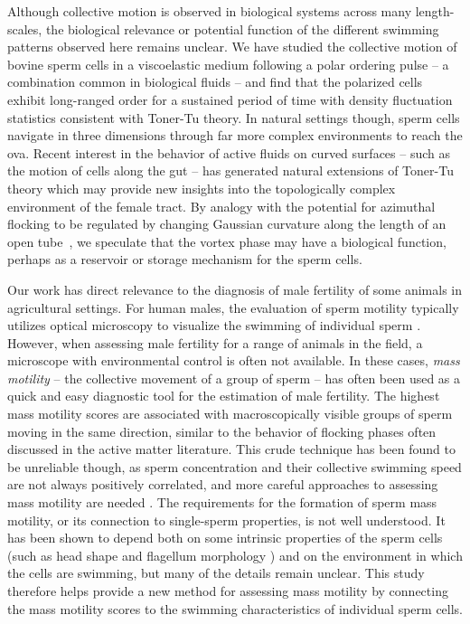 \documentclass[reprint,unsortedaddress,amsmath,amssymb,aps,pre]{revtex4-2}
\begin{document}
Although collective motion is observed in biological systems across many length-scales, the biological relevance or potential function of the different swimming patterns observed here remains unclear. We have studied the collective motion of bovine sperm cells in a viscoelastic medium following a polar ordering pulse -- a combination common in biological fluids -- and find that the polarized cells exhibit long-ranged order for a sustained period of time with density fluctuation statistics consistent with Toner-Tu theory. In natural settings though, sperm cells navigate in three dimensions through far more complex environments to reach the ova. Recent interest in the behavior of active fluids on curved surfaces \cite{sknepnek2015active} -- such as the motion of cells along the gut \cite{ritsma2014intestinal} -- has generated natural extensions of Toner-Tu theory \cite{shankar2017topological} which may provide new insights into the topologically complex environment of the female tract. By analogy with the potential for azimuthal flocking to be regulated by changing Gaussian curvature along the length of an open tube~\cite{shankar2017topological}, we speculate that the vortex phase may have a biological function, perhaps as a reservoir or storage mechanism for the sperm cells.

Our work has direct relevance to the diagnosis of male fertility of some animals in agricultural settings. For human males, the evaluation of sperm motility typically utilizes optical microscopy to visualize the swimming of individual sperm \cite{Gaffney2021modelling}. However, when assessing male fertility for a range of animals in the field, a microscope with environmental control is often not available. In these cases, \emph{mass motility} -- the collective movement of a group of sperm \cite{DAVID2015mass, david2018new} -- has often been used as a quick and easy diagnostic tool for the estimation of male fertility. The highest mass motility scores are associated with macroscopically visible groups of sperm moving in the same direction, similar to the behavior of flocking phases often discussed in the active matter literature. This crude technique has been found to be unreliable though, as sperm concentration and their collective swimming speed are not always positively correlated, and more careful approaches to assessing mass motility are needed \cite{koziol2018manual}. The requirements for the formation of sperm mass motility, or its connection to single-sperm properties, is not well understood. It has been shown to depend both on some intrinsic properties of the sperm cells (such as head shape \cite{breed2005evolution, pearce2018cellular} and flagellum morphology \cite{hook2020methodological}) and on the environment in which the cells are swimming, but many of the details remain unclear. This study therefore helps provide a new method for assessing mass motility by connecting the mass motility scores to the swimming characteristics of individual sperm cells.
\end{document}

